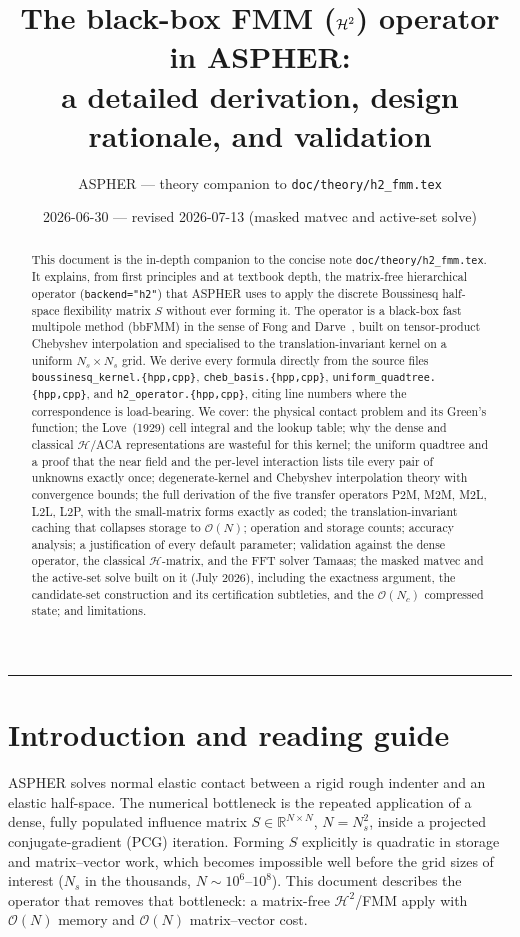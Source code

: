 \documentclass[11pt,a4paper]{article}
\title{The black-box FMM ($\Htwo$) operator in ASPHER:\\[4pt]
a detailed derivation, design rationale, and validation}
\author{ASPHER --- theory companion to \texttt{doc/theory/h2\_fmm.tex}}
\date{2026-06-30 --- revised 2026-07-13 (masked matvec and active-set solve)}
\newcommand{\Order}{\mathcal{O}}
\newcommand{\R}{\mathbb{R}}
\newcommand{\Htwo}{\mathcal{H}^2}
\newcommand{\Hmat}{\mathcal{H}}
\newcommand{\code}[1]{\texttt{#1}}
\theoremstyle{definition}
\theoremstyle{remark}
\begin{document}
\maketitle

\begin{abstract}
This document is the in-depth companion to the concise note
\texttt{doc/theory/h2\_fmm.tex}. It explains, from first principles and at
textbook depth, the matrix-free hierarchical operator (\code{backend="h2"})
that ASPHER uses to apply the discrete Boussinesq half-space flexibility
matrix $S$ without ever forming it. The operator is a black-box fast multipole
method (bbFMM) in the sense of Fong and Darve~\cite{FongDarve2009}, built on
tensor-product Chebyshev interpolation and specialised to the
translation-invariant kernel on a uniform $N_s\times N_s$ grid. We derive every
formula directly from the source files \code{boussinesq\_kernel.\{hpp,cpp\}},
\code{cheb\_basis.\{hpp,cpp\}}, \code{uniform\_quadtree.\{hpp,cpp\}}, and
\code{h2\_operator.\{hpp,cpp\}}, citing line numbers where the correspondence is
load-bearing. We cover: the physical contact problem and its Green's function;
the Love~(1929) cell integral and the lookup table; why the dense and classical
$\Hmat$/ACA representations are wasteful for this kernel; the uniform quadtree
and a proof that the near field and the per-level interaction lists tile every
pair of unknowns exactly once; degenerate-kernel and Chebyshev interpolation
theory with convergence bounds; the full derivation of the five transfer
operators P2M, M2M, M2L, L2L, L2P, with the small-matrix forms exactly as
coded; the translation-invariant caching that collapses storage to $\Order(N)$;
operation and storage counts; accuracy analysis; a justification of every
default parameter; validation against the dense operator, the classical
$\Hmat$-matrix, and the FFT solver Tamaas; the masked matvec and the
active-set solve built on it (July 2026), including the exactness argument,
the candidate-set construction and its certification subtleties, and the
$\Order(N_c)$ compressed state; and limitations.
\end{abstract}

\tableofcontents
\bigskip
\hrule

\section{Introduction and reading guide}
\label{sec:intro}

ASPHER solves normal elastic contact between a rigid rough indenter and an
elastic half-space. The numerical bottleneck is the repeated application of a
dense, fully populated influence matrix $S\in\R^{N\times N}$, $N=N_s^2$, inside
a projected conjugate-gradient (PCG) iteration. Forming $S$ explicitly is
quadratic in storage and matrix--vector work, which becomes impossible well
before the grid sizes of interest ($N_s$ in the thousands, $N\sim10^{6}$--$10^{8}$).
This document describes the operator that removes that bottleneck: a
matrix-free $\Htwo$/FMM apply with $\Order(N)$ memory and $\Order(N)$
matrix--vector cost.
\end{document}
